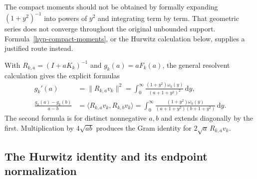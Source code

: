 \documentclass[11pt,a4paper]{article}
\numberwithin{equation}{section}
\theoremstyle{definition}
\theoremstyle{remark}
\newcommand{\ip}[2]{\langle #1,#2\rangle}
\newcommand{\norm}[1]{\lVert #1\rVert}
\newcommand{\dd}{\,\mathrm d}
\begin{document}
The compact moments should not be obtained by formally expanding
$(1+y^2)^{-1}$ into powers of $y^2$ and integrating term by term.
That geometric series does not converge throughout the original
unbounded support. Formula~\eqref{hyp-compact-moments}, or the
Hurwitz calculation below, supplies a justified route instead.

With $R_{k,a}=(I+aK_k)^{-1}$ and $g_k(a)=aF_k(a)$,
the general resolvent calculation gives the explicit formulas
\begin{align}
g_k'(a)
&=\norm{R_{k,a}v_k}^2
=\int_0^\infty\frac{(1+y^2)\omega_k(y)}{(a+1+y^2)^2}\dd y,
\label{hyp-energy}\\
\frac{g_k(a)-g_k(b)}{a-b}
&=\ip{R_{k,a}v_k}{R_{k,b}v_k}
=\int_0^\infty
\frac{(1+y^2)\omega_k(y)}{(a+1+y^2)(b+1+y^2)}\dd y.
\label{hyp-gram}
\end{align}
The second formula is for distinct nonnegative $a,b$ and extends
diagonally by the first. Multiplication by $4\sqrt{ab}$ produces
the Gram identity for $2\sqrt a\,R_{k,a}v_k$.

\subsection{The Hurwitz identity and its endpoint normalization}
\end{document}
